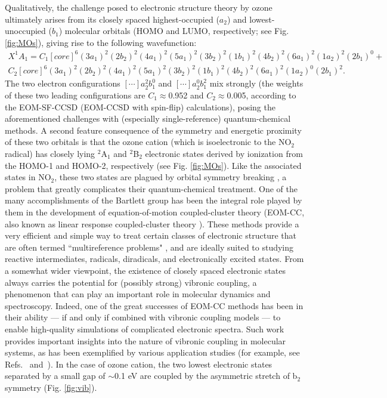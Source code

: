 \documentclass[12pt,prb,aps]{revtex4}
\begin{document}
Qualitatively, the challenge posed to electronic structure theory by ozone
ultimately arises from its closely spaced highest-occupied ($a_2$) and
lowest-unoccupied ($b_1$) molecular orbitals (HOMO and LUMO, respectively; see Fig. \ref{fig:MOs}), giving rise to the following wavefunction:
\begin{eqnarray}
X^1A_1 = C_1 [core]^6 (3a_1)^2 (2b_2)^2 (4a_1)^2  (5a_1)^2 (3b_2)^2  (1b_1)^2   (4b_2)^2 (6a_1)^2 (1a_2)^2 (2b_1)^0 + \\
C_2
[core]^6 (3a_1)^2 (2b_2)^2 (4a_1)^2  (5a_1)^2 (3b_2)^2  (1b_1)^2 (4b_2)^2 (6a_1)^2 (1a_2)^0
(2b_1)^2.
\end{eqnarray}
The two electron configurations $[\cdots]a_2^2 b_1^0$ and $[\cdots]a_2^0 b_1^2$ 
mix strongly (the weights of these two leading configurations are $C_1\approx$0.952 and $C_2\approx$0.005,
according to the EOM-SF-CCSD (EOM-CCSD with spin-flip) calculations\cite{sfccsd}), 
posing the aforementioned challenges with (especially
single-reference) quantum-chemical methods.   
A second feature consequence of
the symmetry and energetic proximity of these two orbitals is that the ozone
cation (which is isoelectronic to the NO$_2$ radical) has closely lying
$^2$A$_1$ and $^2$B$_2$ electronic states derived by ionization from the HOMO-1 and HOMO-2, respectively (see Fig. \ref{fig:MOs}).
Like the associated states in NO$_2$,
these two states are plagued by orbital symmetry breaking
\cite{Davidson:SymmBreak:76}, a problem that greatly complicates
their quantum-chemical treatment.  One of the many
accomplishments of the Bartlett group has been the integral role played by
them in the development of equation-of-motion coupled-cluster theory
\cite{Stanton:93:EOMCC, Nooijen:EOMEA:95, Bartlett:CC_review:07} (EOM-CC, also
known as linear response coupled-cluster theory \cite{Koch:90:LinResp}). These
methods provide a very efficient and simple way to treat certain classes of electronic structure
that are often termed ``multireference problems" \cite{Krylov:EOMRev:07,Krylov:OSRev}, and
are ideally suited to studying reactive intermediates, radicals,
diradicals, and electronically excited states. From a somewhat wider
viewpoint, the existence of closely spaced electronic states always carries
the potential for (possibly strong) vibronic coupling, a phenomenon that can
play an important role in molecular dynamics and spectroscopy. 
Indeed, one of
the great successes of EOM-CC methods has been in their ability --- if and only
if combined with vibronic coupling models --- to enable high-quality
simulations of complicated electronic spectra.  Such work provides important
insights into the nature of vibronic coupling in molecular systems, as has been
exemplified by various application studies (for example, see
Refs.~ and~). In the case of ozone cation, 
the two lowest electronic states separated by a small gap of $\sim$0.1 eV are coupled  
by the asymmetric stretch of b$_2$ symmetry (Fig. \ref{fig:vib}). 
\end{document}
